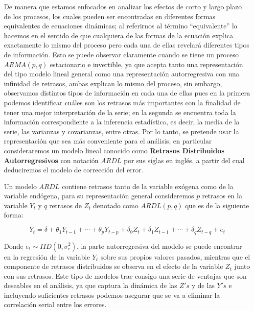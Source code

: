 De manera que estamos enfocados en analizar los efectos de corto y largo plazo de los procesos, los cuales pueden ser encontradas en diferentes formas equivalentes de ecuaciones dinámicas; al referirnos al término ``equivalente'' lo hacemos en el sentido de que cualquiera de las formas de la ecuación explica exactamente lo mismo del proceso pero cada una de ellas revelará diferentes tipos de información. Esto se puede observar claramente cuando se tiene un proceso $ARMA(p,q)$ estacionario e invertible, ya que acepta tanto una representación del tipo modelo lineal general como una representación autorregresiva con una infinidad de retrasos, ambas explican lo mismo del proceso, sin embargo, observamos distintos tipos de información en cada una de ellas pues en la primera podemos identificar cuáles son los retrasos más importantes con la finalidad de tener una mejor interpretación de la serie; en la segunda se encuentra toda la información correspondiente a la inferencia estadística, es decir, la media de la serie, las varianzas y covarianzas, entre otras. Por lo tanto, se pretende usar la representación que sea más conveniente para el análisis, en particular consideraremos un modelo lineal conocido como \textbf{Retrasos Distribuidos Autorregresivos} con notación $ARDL$ por sus siglas en inglés, a partir del cual deduciremos el modelo de corrección del error. \bigskip

Un modelo $ARDL$ contiene retrasos tanto de la variable exógena como de la variable endógena, para su representación general consideremos $p$ retrasos en la variable $Y_t$ y $q$ retrasos de $Z_t$ denotado como $ARDL(p,q)$ que es de la siguiente forma:

\begin{equation}
Y_t=\delta + \theta_1 Y_{t-1} + \cdots + \theta_p Y_{t-p} + \delta_0 Z_t + \delta_1 Z_{t-1} + \cdots + \delta_q Z_{t-q} + e_t  \label{eq:ADL}
\end{equation}
 
 Donde $e_t\sim IID(0,\sigma^2_e)$, la parte autorregresiva del modelo se puede encontrar en la regresión de la variable $Y_t$ sobre sus propios valores pasados, mientras que el componente de retrasos distribuidos se observa en el efecto de la variable $Z_t$ junto con sus retrasos. Este tipo de modelos trae consigo una serie de ventajas que son deseables en el análisis, ya que captura la dinámica de las $Z's$ y de las $Y's$ e incluyendo suficientes retrasos podemos asegurar que se va a eliminar la correlación serial entre los errores. \bigskip
 
